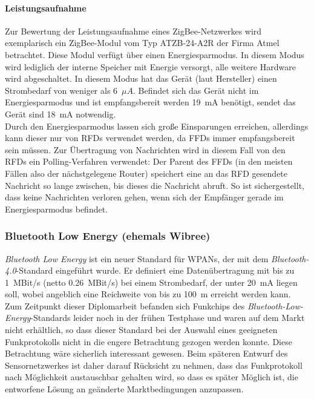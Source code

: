             \paragraph{Leistungsaufnahme}
                Zur Bewertung der Leistungsaufnahme eines ZigBee-Netzwerkes wird exemplarisch ein ZigBee-Modul
                vom Typ ATZB-24-A2R der Firma Atmel betrachtet. Diese Modul verfügt über einen Energiesparmodus.
                In diesem Modus wird lediglich der interne Speicher mit Energie versorgt, alle weitere Hardware
                wird abgeschaltet. In diesem Modus hat das Gerät (laut Hersteller) einen Strombedarf von weniger als
                6~$\mu{}A$. Befindet sich das Gerät nicht im Energiesparmodus und ist empfangsbereit werden 19~mA
                benötigt, sendet das Gerät sind 18~mA notwendig.\\
                Durch den Energiesparmodus lassen sich große Einsparungen erreichen, allerdings kann dieser nur von 
                RFDs verwendet werden, da FFDs immer empfangsbereit sein müssen. Zur Übertragung von Nachrichten
                wird in diesem Fall von den RFDs ein Polling-Verfahren verwendet: Der Parent des FFDs (in den meisten
                Fällen also der nächstgelegene Router) speichert eine an das RFD gesendete Nachricht so lange zwischen,
                bis dieses die Nachricht abruft. So ist sichergestellt, dass keine Nachrichten verloren gehen, wenn
                sich der Empfänger gerade im Energiesparmodus befindet.
           

        \subsubsection{Bluetooth Low Energy (ehemals Wibree)}\label{wibree}
            \emph{Bluetooth Low Energy} ist ein neuer Standard für WPANs, der mit dem \emph{Bluetooth-4.0}-Standard 
            eingeführt wurde. Er definiert eine Datenübertragung mit bis zu 1~MBit/s (netto 0.26~MBit/s) bei einem 
            Strombedarf, der unter 20~mA liegen soll, wobei angeblich eine Reichweite von bis zu 100~m erreicht werden 
            kann.\\
            Zum Zeitpunkt dieser Diplomarbeit befanden sich Funkchips des \emph{Bluetooth-Low-Energy}-Standards 
            leider noch in der frühen Testphase und waren auf dem Markt nicht erhältlich, so dass dieser Standard 
            bei der Auswahl eines geeigneten Funkprotokolls nicht in die engere Betrachtung gezogen werden konnte.
            Diese Betrachtung wäre sicherlich interessant gewesen. Beim späteren Entwurf des Sensornetzwerkes
            ist daher darauf Rücksicht zu nehmen, dass das Funkprotokoll nach Möglichkeit austauschbar gehalten wird,
            so dass es später Möglich ist, die entworfene Lösung an geänderte Marktbedingungen anzupassen.
            

